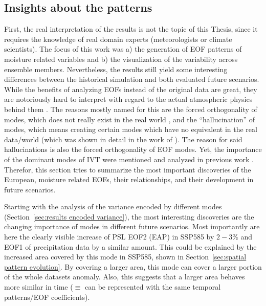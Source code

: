 \subsection{Insights about the patterns}

First, the real interpretation of the results is not the topic of this Thesis, since it requires the knowledge of real domain experts (meteorologists or climate scientists). 
The focus of this work was a) the generation of EOF patterns of moisture related variables and b) the visualization of the variability across ensemble members. 
Nevertheless, the results still yield some interesting differences between the historical simulation and both evaluated future scenarios. 
While the benefits of analyzing EOFs instead of the original data are great, they are notoriously hard to interpret with regard to the actual atmospheric physics behind them \cite{dommenget_cautionary_2002, hannachi_empirical_2007}.
The reasons mostly named for this are the forced orthogonality of modes, which does not really exist in the real world \cite{hannachi_empirical_2007}, and the \enquote{hallucination} of modes, which means creating certain modes which have no equivalent in the real data/world (which was shown in detail in the work of ). 
The reason for said hallucinations is also the forced orthogonality of EOF modes. 
Yet, the importance of the dominant modes of IVT were mentioned and analyzed in previous work \cite{salstein_modes_1983, zou_interdecadal_2018}. 
Therefor, this section tries to summarize the most important discoveries of the European, moisture related EOFs, their relationships, and their development in future scenarios. 

Starting with the analysis of the variance encoded by different modes (Section~\ref{sec:results encoded variance}), the most interesting discoveries are the changing importance of modes in different future scenarios. 
Most importantly are here the clearly visible increase of PSL EOF2 (EAP) in SSP585 by $2-3 \%$ and EOF1 of precipitation data by a similar amount. 
This could be explained by the increased area covered by this mode in SSP585, shown in Section~\ref{sec:spatial pattern evolution}. 
By covering a larger area, this mode can cover a larger portion of the whole datasets anomaly. 
Also, this suggests that a larger area behaves more similar in time ($\equiv$ can be represented with the same temporal patterns/EOF coefficients). 


